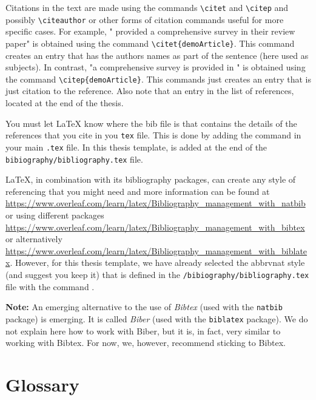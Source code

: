 Citations in the text are made using the commands \verb|\citet| and \verb|\citep| and possibly \verb|\citeauthor| or other forms of citation commands useful for more specific cases.
For example, "\citet{demoArticle} provided a comprehensive survey in their review paper" is obtained using the command \verb|\citet{demoArticle}|.
This command creates an entry that has the authors names as part of the sentence (here used as subjects). 
In contrast, "a comprehensive survey is provided in \citep{demoArticle}" is obtained using the command \verb|\citep{demoArticle}|. 
This commands just creates an entry that is just citation to the reference.
Also note that an entry in the list of references, located at the end of the thesis.

You must let \LaTeX{} know where the bib file is that contains the details of the references that you cite in you \verb|tex| file.
This is done by adding the command \verb|| in your main \verb|.tex| file.
In this thesis template, \verb|| is added at the end of the \verb|bibiography/bibliography.tex| file.

\LaTeX{}, in combination with its bibliography packages, can create any style of referencing that you might need and more information can be found at  \url{https://www.overleaf.com/learn/latex/Bibliography_management_with_natbib} or using different packages \url{https://www.overleaf.com/learn/latex/Bibliography_management_with_bibtex} or alternatively \url{https://www.overleaf.com/learn/latex/Bibliography_management_with_biblatex}.
However, for this thesis template, we have already selected the abbrvnat style (and suggest you keep it) that is defined in the \verb|/bibiography/bibliography.tex| file with the command \verb||.

\textbf{Note:} An emerging alternative to the use of \emph{Bibtex} (used with the \verb|natbib| package) is emerging.
It is called \emph{Biber} (used with the \verb|biblatex| package).
We do not explain here how to work with Biber, but it is, in fact, very similar to working with Bibtex. 
For now, we, however, recommend sticking to Bibtex.

\section{Glossary}
\label{sec:Glossary}

